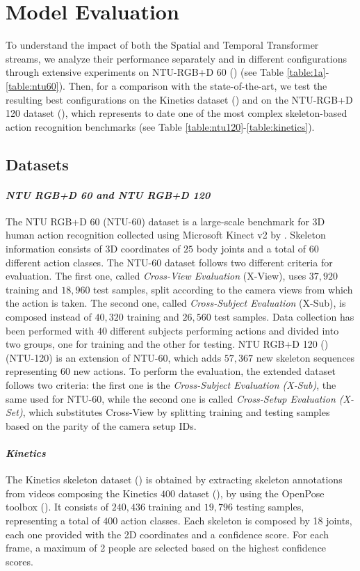 \documentclass[times,twocolumn,final,authoryear]{elsarticle}
\begin{document}
\section{Model Evaluation}
To understand the impact of both the Spatial and Temporal Transformer streams, we analyze their performance separately and in different configurations through extensive experiments on NTU-RGB+D 60 (\cite{ntu}) (see Table \ref{table:1a}-\ref{table:ntu60}). Then, for a comparison with the state-of-the-art, we test the resulting best configurations on the Kinetics dataset (\cite{Kin}) and on the NTU-RGB+D 120 dataset (\cite{ntu120}), which represents to date one of the most complex skeleton-based action recognition benchmarks (see Table \ref{table:ntu120}-\ref{table:kinetics}).


\subsection{Datasets}

\paragraph*{\textbf{\textit{NTU RGB+D 60 and NTU RGB+D 120}}}{The NTU RGB+D 60 (NTU-60) dataset is a large-scale benchmark for 3D human action recognition collected using Microsoft Kinect v2 by \cite{ntu}. Skeleton information consists of 3D coordinates of $25$ body joints and a total of $60$ different action classes. The NTU-60 dataset follows two different criteria for evaluation. The first one, called \textit{Cross-View Evaluation} (X-View), uses $37,920$ training and $18,960$ test samples, split according to the camera views from which the action is taken. The second one, called \textit{Cross-Subject Evaluation} (X-Sub), is composed instead of $40,320$ training and $26,560$ test samples. Data collection has been performed with $40$ different subjects performing actions and divided into two groups, one for training and the other for testing. NTU RGB+D 120 (\cite{ntu120}) (NTU-120) is an extension of NTU-60, which adds $57,367$ new skeleton sequences representing $60$ new actions. To perform the evaluation, the extended dataset follows two criteria: the first one is the \textit{Cross-Subject Evaluation (X-Sub)}, the same used for NTU-60, while the second one is called \textit{Cross-Setup Evaluation (X-Set)}, which substitutes Cross-View by splitting training and testing samples based on the parity of the camera setup IDs.  } 

\paragraph*{\textbf{\textit{Kinetics}}} The Kinetics skeleton dataset (\cite{yan2018spatial}) is obtained by extracting skeleton annotations from videos composing the Kinetics $400$ dataset (\cite{Kin}), by using the OpenPose toolbox (\cite{openpose}). It consists of $240,436$ training and $19,796$ testing samples, representing a total of $400$ action classes. Each skeleton is composed by 18 joints, each one provided with the 2D coordinates and a confidence score. For each frame, a maximum of 2 people are selected based on the highest confidence scores. 
\end{document}
